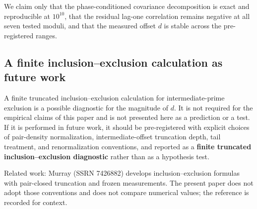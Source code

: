 We claim only that the phase-conditioned covariance decomposition is exact and reproducible at $10^{10}$, that the residual lag-one correlation remains negative at all seven tested moduli, and that the measured offset $d$ is stable across the pre-registered ranges.

\subsection{A finite inclusion--exclusion calculation as future work}

A finite truncated inclusion--exclusion calculation for intermediate-prime exclusion is a possible diagnostic for the magnitude of $d$. It is not required for the empirical claims of this paper and is not presented here as a prediction or a test. If it is performed in future work, it should be pre-registered with explicit choices of pair-density normalization, intermediate-offset truncation depth, tail treatment, and renormalization conventions, and reported as a \textbf{finite truncated inclusion--exclusion diagnostic} rather than as a hypothesis test.

Related work: Murray (SSRN 7426882) develops inclusion--exclusion formulas with pair-closed truncation and frozen measurements. The present paper does not adopt those conventions and does not compare numerical values; the reference is recorded for context.
